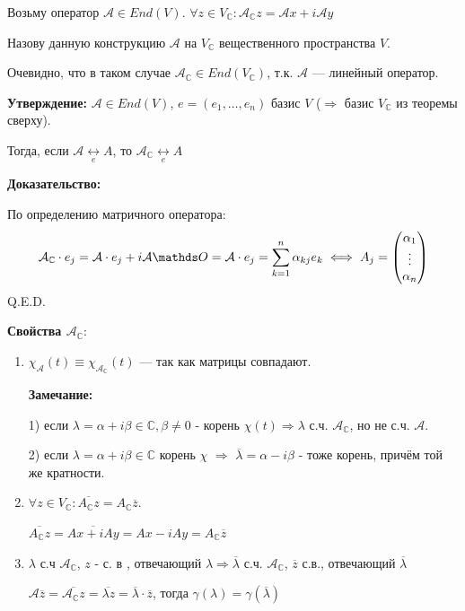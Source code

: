  Возьму оператор $\mathcal{A} \in End(V)$.  $\forall z \in V_{\mathbb{C}}: \mathcal{A}_{\mathbb{C}}z =\mathcal{A}x + i \mathcal{A}y$ 

Назову данную конструкцию  $\mathcal{A}$ на $V_{\mathbb{C}}$ вещественного пространства $V$.

Очевидно, что в таком случае $\mathcal{A}_\mathbb{C} \in End(V_{\mathbb{C}})$, т.к. $\mathcal{A}$ --- линейный оператор.

\textbf{Утверждение:} $\mathcal{A} \in End(V)$, $e = (e_1,\ldots, e_n) $ базис $V$ ($\Rightarrow$ базис $V_{\mathbb{C}}$ из теоремы сверху). 


Тогда, если $\mathcal{A} \underset{e} \leftrightarrow A$, то $ \mathcal{A}_{\mathbb{C}} \underset{e} \leftrightarrow A$

\textbf{Доказательство:}

По определению матричного оператора:
$$\mathcal{A}_{\mathbb{C}}  \cdot e_j = \mathcal{A}  \cdot e_j + i\mathcal{A} \zero = \mathcal{A} \cdot e_j =\sum\limits_{k=1}^n \alpha_{kj}e_k \iff A_j = \begin{pmatrix}
    \alpha_1\\
    \vdots \\
    \alpha_n
\end{pmatrix}$$
\hfill Q.E.D.


\textbf{Свойства $\mathcal{A_\mathbb{C}}$}:

\begin{enumerate}
   \item $\chi_{\mathcal{A}} (t) \equiv \chi_\mathcal{A_\mathbb{C}}(t)$ --- так как матрицы совпадают.

    \textbf{Замечание:} 
    
    1) если $\lambda = \alpha + i\beta \in \mathbb{C}, \beta \neq 0$ - корень $\chi(t) \Rightarrow \lambda$ с.ч. $\mathcal{A_\mathbb{C}}$, но не с.ч. $\mathcal{A}$.

   2) если $\lambda = \alpha + i\beta \in \mathbb{C}$ корень $\chi$ $\Rightarrow$ $\overline{\lambda}=\alpha - i\beta$ - тоже корень, причём той же кратности.

    \item $\forall z \in V_{\mathbb{C}}: \overline{A_{\mathbb{C}}z } = A_{\mathbb{C}}\overline{z}$.

     $\overline{A_{\mathbb{C}}z} = \overline{Ax + iAy} = Ax - iAy = A_{\mathbb{C}}\overline{z}$

    \item $\lambda$ с.ч $\mathcal{A_\mathbb{C}} $, $z$ - с. в , отвечающий $\lambda$$\Rightarrow$$ \overline{\lambda}$ с.ч. $\mathcal{A_\mathbb{C}}$, $\overline{z}$ с.в., отвечающий $\overline{\lambda}$

    $\mathcal{A}\overline{z} = \overline{\mathcal{A}_{\mathbb{C}}z} = \overline{\lambda z} = \overline{\lambda} \cdot \overline{z}$, тогда $\gamma(\lambda) = \gamma(\overline{\lambda})$
\end{enumerate}

